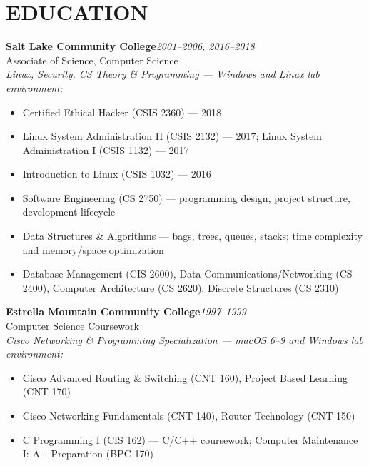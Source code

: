 \documentclass[9pt,letterpaper]{extarticle}
\begin{document}
\section*{EDUCATION}

\noindent\textbf{Salt Lake Community College}\hfill\textit{2001--2006, 2016--2018}\\
Associate of Science, Computer Science\\
\textit{Linux, Security, CS Theory \& Programming --- Windows and Linux lab environment:}
\begin{itemize}
  \item Certified Ethical Hacker (CSIS 2360) --- 2018
  \item Linux System Administration II (CSIS 2132) --- 2017; Linux System Administration I (CSIS 1132) --- 2017
  \item Introduction to Linux (CSIS 1032) --- 2016
  \item Software Engineering (CS 2750) --- programming design, project structure, development lifecycle
  \item Data Structures \& Algorithms --- bags, trees, queues, stacks; time complexity and memory/space optimization
  \item Database Management (CIS 2600), Data Communications/Networking (CS 2400), Computer Architecture (CS 2620), Discrete Structures (CS 2310)
\end{itemize}

\vspace{4pt}
\noindent\textbf{Estrella Mountain Community College}\hfill\textit{1997--1999}\\
Computer Science Coursework\\
\textit{Cisco Networking \& Programming Specialization --- macOS 6--9 and Windows lab environment:}
\begin{itemize}
  \item Cisco Advanced Routing \& Switching (CNT 160), Project Based Learning (CNT 170)
  \item Cisco Networking Fundamentals (CNT 140), Router Technology (CNT 150)
  \item C Programming I (CIS 162) --- C/C++ coursework; Computer Maintenance I: A+ Preparation (BPC 170)
\end{itemize}
\end{document}
